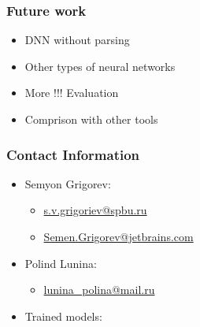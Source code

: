 \documentclass[xcolor=table]{beamer}
\begin{document}
\begin{frame} \frametitle{Future work}

\begin{itemize}
 \item DNN without parsing
 \item Other types of neural networks
 \item More !!! Evaluation
 \item Comprison with other tools
\end{itemize}

\end{frame}

\begin{frame}
\frametitle{Contact Information}
\begin{itemize}
  \item Semyon Grigorev:
    \begin{itemize}
      \item \href{mailto:s.v.grigoriev@spbu.ru}{s.v.grigoriev@spbu.ru}
      \item \href{mailto:Semen.Grigorev@jetbrains.com}{Semen.Grigorev@jetbrains.com}
    \end{itemize}
  \item Polind Lunina:
  \begin{itemize}
    \item  \href{mailto:lunina_polina@mail.ru}{lunina\_polina@mail.ru}
  \end{itemize}
  \item Trained models:
\end{itemize}
\vspace{2cm}
\pause
{}
\end{frame}
\end{document}
